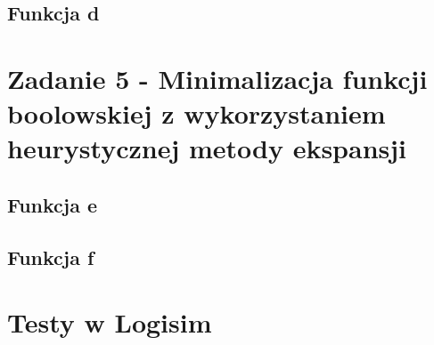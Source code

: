 \documentclass[a4paper, 12pt]{article}
\begin{document}
    \newpage
    \subsection{Funkcja d}\label{subsec:fun-d}
    

    \newpage
    \section{Zadanie 5 - Minimalizacja funkcji boolowskiej z wykorzystaniem heurystycznej metody ekspansji}\label{sec:task-4}
    \subsection{Funkcja e}\label{subsec:fun-e}
    

    \newpage
    \subsection{Funkcja f}\label{subsec:fun-f}
    

    \newpage
    \section{Testy w Logisim}\label{sec:test}
    
\end{document}
